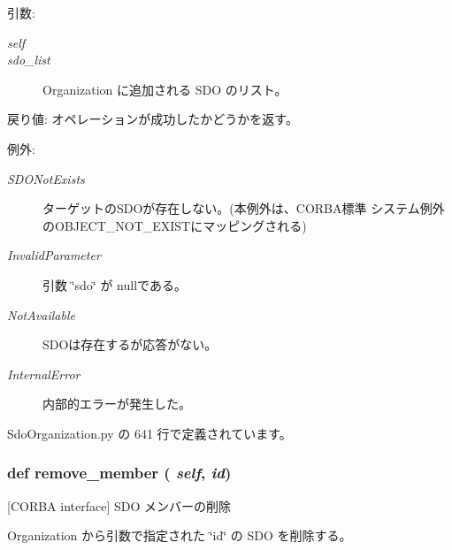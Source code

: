 \begin{Desc}
\item[引数:]
\begin{description}
\item[{\em self}]\item[{\em sdo\_\-list}]Organization に追加される SDO のリスト。\end{description}
\end{Desc}
\begin{Desc}
\item[戻り値:]オペレーションが成功したかどうかを返す。\end{Desc}
\begin{Desc}
\item[例外:]
\begin{description}
\item[{\em SDONotExists}]ターゲットのSDOが存在しない。(本例外は、CORBA標準 システム例外のOBJECT\_\-NOT\_\-EXISTにマッピングされる) \item[{\em InvalidParameter}]引数 \char`\"{}sdo\char`\"{} が nullである。 \item[{\em NotAvailable}]SDOは存在するが応答がない。 \item[{\em InternalError}]内部的エラーが発生した。 \end{description}
\end{Desc}


 SdoOrganization.py の 641 行で定義されています。
\subsubsection{\setlength{\rightskip}{0pt plus 5cm}def remove\_\-member ( {\em self},  {\em id})}\label{classsource__py_1_1_sdo_organization_1_1_organization__impl_ecdaec79a448eb385eca26fa770de493}


[CORBA interface] SDO メンバーの削除 

Organization から引数で指定された \char`\"{}id\char`\"{} の SDO を削除する。

